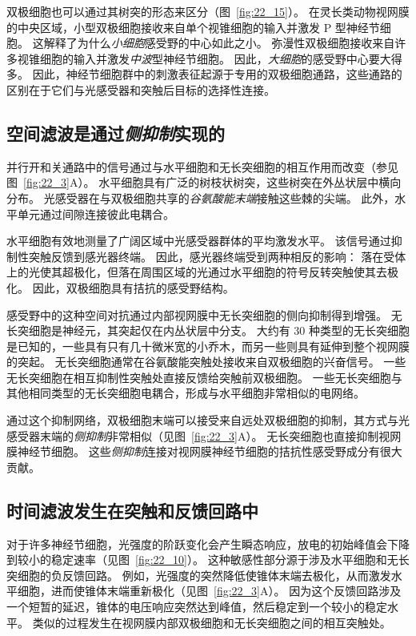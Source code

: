 双极细胞也可以通过其树突的形态来区分（图~\ref{fig:22_15}）。
在灵长类动物视网膜的中央区域，小型双极细胞接收来自单个视锥细胞的输入并激发 P 型神经节细胞。
这解释了为什么\textit{小细胞}感受野的中心如此之小。
弥漫性双极细胞接收来自许多视锥细胞的输入并激发\textit{中波}型神经节细胞。
因此，\textit{大细胞}的感受野中心要大得多。
因此，神经节细胞群中的刺激表征起源于专用的双极细胞通路，这些通路的区别在于它们与光感受器和突触后目标的选择性连接。



\subsection{空间滤波是通过\textit{侧抑制}实现的}

并行开和关通路中的信号通过与水平细胞和无长突细胞的相互作用而改变（参见图~\ref{fig:22_3}A）。
水平细胞具有广泛的树枝状树突，这些树突在外丛状层中横向分布。
光感受器在与双极细胞共享的\textit{谷氨酸能末端}接触这些棘的尖端。
此外，水平单元通过间隙连接彼此电耦合。


水平细胞有效地测量了广阔区域中光感受器群体的平均激发水平。
该信号通过抑制性突触反馈到感光器终端。
因此，感光器终端受到两种相反的影响：
落在受体上的光使其超极化，但落在周围区域的光通过水平细胞的符号反转突触使其去极化。
因此，双极细胞具有拮抗的感受野结构。


感受野中的这种空间对抗通过内部视网膜中无长突细胞的侧向抑制得到增强。
无长突细胞是神经元，其突起仅在内丛状层中分支。
大约有 30 种类型的无长突细胞是已知的，一些具有只有几十微米宽的小乔木，而另一些则具有延伸到整个视网膜的突起。
无长突细胞通常在谷氨酸能突触处接收来自双极细胞的兴奋信号。
一些无长突细胞在相互抑制性突触处直接反馈给突触前双极细胞。
一些无长突细胞与其他相同类型的无长突细胞电耦合，形成与水平细胞非常相似的电网络。


通过这个抑制网络，双极细胞末端可以接受来自远处双极细胞的抑制，其方式与光感受器末端的\textit{侧抑制}非常相似（见图~\ref{fig:22_3}A）。
无长突细胞也直接抑制视网膜神经节细胞。
这些\textit{侧抑制}连接对视网膜神经节细胞的拮抗性感受野成分有很大贡献。



\subsection{时间滤波发生在突触和反馈回路中}

对于许多神经节细胞，光强度的阶跃变化会产生瞬态响应，放电的初始峰值会下降到较小的稳定速率（见图~\ref{fig:22_10}）。
这种敏感性部分源于涉及水平细胞和无长突细胞的负反馈回路。
例如，光强度的突然降低使锥体末端去极化，从而激发水平细胞，进而使锥体末端重新极化（见图~\ref{fig:22_3}A）。
因为这个反馈回路涉及一个短暂的延迟，锥体的电压响应突然达到峰值，然后稳定到一个较小的稳定水平。
类似的过程发生在视网膜内部双极细胞和无长突细胞之间的相互突触处。



